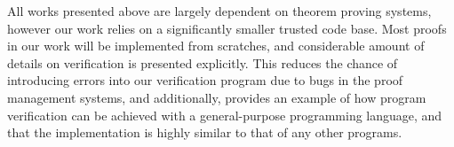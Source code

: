 All works presented above are largely dependent on theorem proving systems, however our work relies on a significantly smaller trusted code base. Most proofs in our work will be implemented from scratches, and considerable amount of details on verification is presented explicitly. This reduces the chance of introducing errors into our verification program due to bugs in the proof management systems, and additionally, provides an example of how program verification can be achieved with a general-purpose programming language, and that the implementation is highly similar to that of any other programs. 




